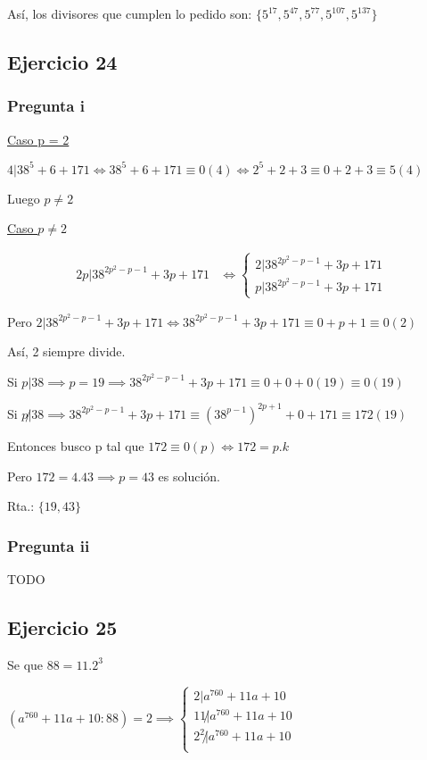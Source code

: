 Así, los divisores que cumplen lo pedido son: $ \{ 5^{17}, 5^{47}, 5^{77}, 5^{107}, 5^{137} \} $

\subsection{Ejercicio 24}

\subsubsection{Pregunta i}

\underline{Caso p = 2}

$ 4|38^5+6+171 \iff 38^5+6+171 \equiv 0(4) \iff 2^5 +2+3\equiv 0+2+3 \equiv 5(4) $

Luego $ p \neq 2 $

\underline{Caso $ p \neq 2 $}

\begin{align*}
    2p | 38^{2p^2-p-1} + 3p+171 &\iff \begin{cases}
        2 | 38^{2p^2-p-1} + 3p+171 \\
        p | 38^{2p^2-p-1} + 3p+171
    \end{cases}
\end{align*}

Pero $ 2 | 38^{2p^2-p-1} + 3p+171 \iff 38^{2p^2-p-1} + 3p+171 \equiv 0+p+1 \equiv 0(2) $

Así, 2 siempre divide.

Si $ p |38 \implies p = 19 \implies 38^{2p^2-p-1} + 3p+171 \equiv 0+0+0(19) \equiv 0(19)$

Si $ p \not |38 \implies 38^{2p^2-p-1} + 3p+171 \equiv (38^{p-1})^{2p+1} + 0+171 \equiv 172(19)$

Entonces busco p tal que $ 172 \equiv 0(p) \iff 172 = p.k $

Pero $ 172 = 4.43 \implies p = 43 $ es solución.

Rta.: $ \{ 19,43 \} $

\subsubsection{Pregunta ii}
TODO

\subsection{Ejercicio 25}

Se que $ 88 = 11.2^3 $

$ (a^{760} + 11a + 10 : 88) = 2 \implies \begin{cases}
    2 | a^{760} + 11a + 10 \\
    11 \not | a^{760} + 11a + 10 \\
    2^2 \not | a^{760} + 11a + 10 \\
\end{cases} $

